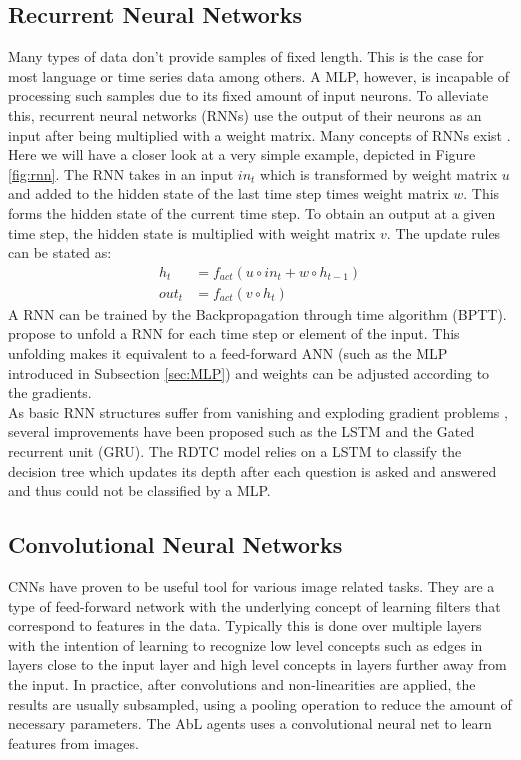\documentclass[a4paper,cleardoubleempty,BCOR1cm, 11pt]{report}
\begin{document}
\subsection{Recurrent Neural Networks}
Many types of data don't provide samples of fixed length. This is the case for most language or time series data among others. A MLP, however, is incapable of processing such samples due to its fixed amount of input neurons. To alleviate this, recurrent neural networks (RNNs) use the output of their neurons as an input after being multiplied with a weight matrix. Many concepts of RNNs exist \cite{Grossberg:2013}. Here we will have a closer look at a very simple example, depicted in Figure \ref{fig:rnn}.
The  RNN takes in an input $in_t$ which is transformed by weight matrix $u$ and added to the hidden state of the last time step times weight matrix $w$. This forms the hidden state of the current time step. To obtain an output at a given time step, the hidden state is multiplied with weight matrix $v$. The update rules can be stated as:
\begin{align}
	h_t &= f_{act}(u \circ in_t + w \circ h_{t-1})\\
	out_t &=f_{act}(v \circ h_t)
\end{align}
A RNN can be trained by the Backpropagation through time algorithm (BPTT). \citet{werbos1990backpropagation} propose to unfold a RNN for each time step or element of the input. This unfolding makes it equivalent to a feed-forward ANN (such as the MLP introduced in Subsection \ref{sec:MLP}) and weights can be adjusted according to the gradients.\\
As basic RNN structures suffer from vanishing and exploding gradient problems \cite{bengio1994learning}, several improvements have been proposed such as the LSTM \cite{hochreiter1997long} and the Gated recurrent unit (GRU)\cite{cho2014learning}.
The RDTC model relies on a LSTM to classify the decision tree which updates its depth after each question is asked and answered and thus could not be classified by a MLP.


\subsection{Convolutional Neural Networks}
CNNs have proven to be useful tool for various image related tasks. They are a type of feed-forward network with the underlying concept of learning filters that correspond to features in the data. Typically this is done over multiple layers with the intention of learning to recognize low level concepts such as edges in layers close to the input layer and high level concepts in layers further away from the input. In practice, after convolutions and non-linearities are applied, the results are usually subsampled, using a pooling operation to reduce the amount of necessary parameters. The AbL agents uses a convolutional neural net to learn features from images.
\end{document}
